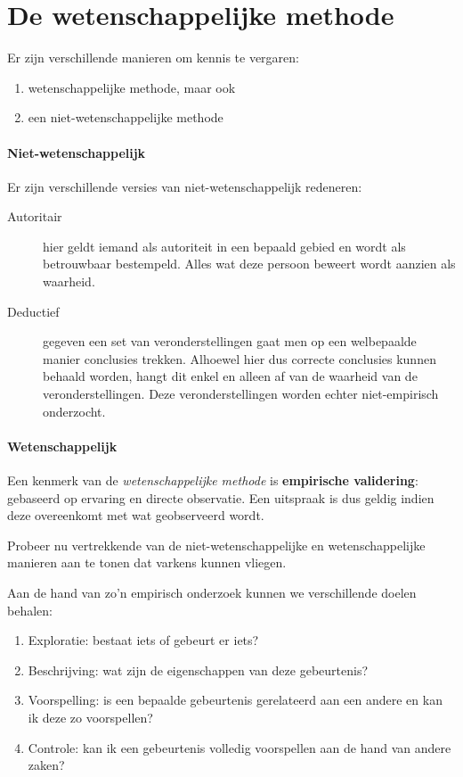 \section{De wetenschappelijke methode}

Er zijn verschillende manieren om kennis te vergaren:

\begin{enumerate}
  \item wetenschappelijke methode, maar ook 
  \item een niet-wetenschappelijke methode
\end{enumerate}

\paragraph{Niet-wetenschappelijk}Er zijn verschillende versies van niet-wetenschappelijk redeneren: 
\begin{description}
  \item [Autoritair] hier geldt iemand als autoriteit in een bepaald gebied en wordt als betrouwbaar bestempeld. Alles wat deze persoon beweert wordt aanzien als waarheid. 
  \item [Deductief] gegeven een set van veronderstellingen gaat men op een welbepaalde manier conclusies trekken. Alhoewel hier dus correcte conclusies kunnen behaald worden, hangt dit enkel en alleen af van de waarheid van de veronderstellingen. Deze veronderstellingen worden echter niet-empirisch onderzocht.
\end{description}

\paragraph{Wetenschappelijk}
Een kenmerk van de \textsl{wetenschappelijke methode} is \textbf{empirische validering}: gebaseerd op ervaring en directe observatie. Een uitspraak is dus geldig indien deze overeenkomt met wat geobserveerd wordt.

\begin{exercise}
Probeer nu vertrekkende van de niet-wetenschappelijke en wetenschappelijke manieren aan te tonen dat varkens kunnen vliegen. 
\end{exercise}

Aan de hand van zo'n empirisch onderzoek kunnen we verschillende doelen behalen:
\begin{enumerate}
  \item Exploratie: bestaat iets of gebeurt er iets?
  \item Beschrijving: wat zijn de eigenschappen van deze gebeurtenis?
  \item Voorspelling: is een bepaalde gebeurtenis gerelateerd aan een andere en kan ik deze zo voorspellen?
  \item Controle: kan ik een gebeurtenis volledig voorspellen aan de hand van andere zaken?
\end{enumerate}


